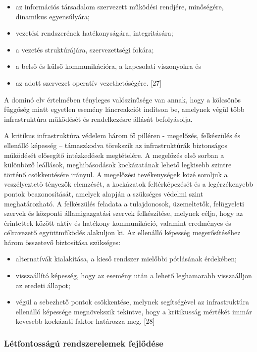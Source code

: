\documentclass[12pt,magyar,a4paper,oneside]{scrreprt}
\providecommand{\tightlist}{%
  \setlength{\itemsep}{0pt}\setlength{\parskip}{0pt}}
\begin{document}
\begin{itemize}
\tightlist
\item
  az információs társadalom szervezett működési rendjére, minőségére,
  dinamikus egyensúlyára;
\item
  vezetési rendszerének hatékonyságára, integritására;
\item
  a vezetés struktúrájára, szervezettségi fokára;
\item
  a belső és külső kommunikációra, a kapcsolati viszonyokra és
\item
  az adott szervezet operatív vezethetőségére. {[}27{]}
\end{itemize}

A dominó elv értelmében tényleges valószínűsége van annak, hogy a
kölcsönös függőség miatt egyetlen esemény láncreakciót indítson be,
amelynek végül több infrastruktúra működését és rendelkezésre állását
befolyásolja.

A kritikus infrastruktúra védelem három fő pilléren - megelőzés,
felkészülés és ellenálló képesség -- támaszkodva törekszik az
infrastruktúrák biztonságos működését elősegítő intézkedések
megtételére. A megelőzés első sorban a különböző leállások,
meghibásodások kockázatának lehető legkisebb szintre történő
csökkentésére irányul. A megelőzési tevékenységek közé soroljuk a
veszélyeztető tényezők elemzését, a kockázatok feltérképezését és a
legérzékenyebb pontok beazonosítását, amelyek alapján a szükséges
védelmi szint meghatározható. A felkészülés feladata a tulajdonosok,
üzemeltetők, felügyeleti szervek és központi államigazgatási szervek
felkészítése, melynek célja, hogy az érintettek között aktív és hatékony
kommunikáció, valamint eredményes és célravezető együttműködés alakuljon
ki. Az ellenálló képesség megerősítéséhez három összetevő biztosítása
szükséges:

\begin{itemize}
\tightlist
\item
  alternatívák kialakítása, a kieső rendszer mielőbbi pótlásának
  érdekében;
\item
  visszaállító képesség, hogy az esemény után a lehető leghamarabb
  visszaálljon az eredeti állapot;
\item
  végül a sebezhető pontok csökkentése, melynek segítségével az
  infrastruktúra ellenálló képessége megnövekszik tekintve, hogy a
  kritikusság mértékét immár kevesebb kockázati faktor határozza meg.
  {[}28{]}
\end{itemize}

\hypertarget{luxe9tfontossuxe1guxfa-rendszerelemek-fejlux151duxe9se}{%
\subsubsection{Létfontosságú rendszerelemek
fejlődése}\label{luxe9tfontossuxe1guxfa-rendszerelemek-fejlux151duxe9se}}
\end{document}
